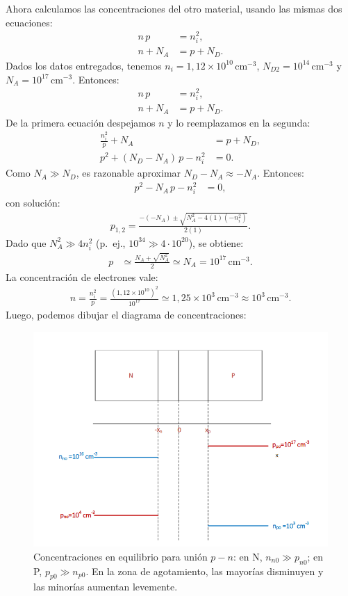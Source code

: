 Ahora calculamos las concentraciones del otro material, usando las mismas dos ecuaciones:
\begin{align}
n\,p &= n_i^{2},\\
n + N_A &= p + N_D.
\end{align}
Dados los datos entregados, tenemos \(n_i = 1{,}12\times 10^{10}\,\text{cm}^{-3}\), \(N_{D2}=10^{14}\,\text{cm}^{-3}\) y \(N_A=10^{17}\,\text{cm}^{-3}\). Entonces:
\begin{align}
n\,p &= n_i^{2},\\
n + N_A &= p + N_D.
\end{align}
De la primera ecuación despejamos \(n\) y lo reemplazamos en la segunda:
\begin{align}
    \frac{n_i^2}{p}+N_A &= p+N_D,\\
    p^2 + (N_D-N_A)\,p - n_i^2 &= 0.
\end{align}
Como \(N_A \gg N_D\), es razonable aproximar \(N_D-N_A \approx -N_A\). Entonces:
\begin{align}
    p^2 - N_A\, p - n_i^2 &= 0,
\end{align}
con solución:
\begin{align}
    p_{1,2}=\frac{-(-N_A)\pm\sqrt{N_A^{2}-4(1)(-n_i^{2})}}{2(1)}.
\end{align}
Dado que \(N_A^2 \gg 4n_i^2\) (p.\ ej., \(10^{34}\gg 4\cdot 10^{20}\)), se obtiene:
\begin{align}
    p &\simeq \frac{N_A+\sqrt{N_A^2}}{2} \simeq N_A = 10^{17}\,\text{cm}^{-3}.
\end{align}
La concentración de electrones vale:
\begin{align}
    n=\frac{n_i^2}{p}=\frac{(1{,}12\times 10^{10})^2}{10^{17}}
    \simeq 1{,}25\times 10^{3}\,\text{cm}^{-3}\approx 10^{3}\,\text{cm}^{-3}.
\end{align}
Luego, podemos dibujar el diagrama de concentraciones:
\begin{figure}
    \centering
    \includegraphics[scale=0.8]{img/P1_6.png}
    \caption{Concentraciones en equilibrio para unión \(p\!-\!n\): en N, \(n_{n0}\gg p_{n0}\); en P, \(p_{p0}\gg n_{p0}\). En la zona de agotamiento, las mayorías disminuyen y las minorías aumentan levemente.}
\end{figure}

